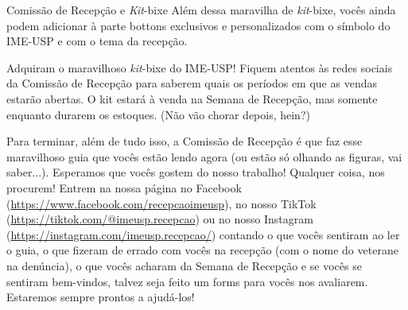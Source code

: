 \begin{secao}{Comissão de Recepção e \textit{Kit}-bixe}
Além dessa maravilha de \textit{kit}-bixe, vocês ainda podem adicionar à parte bottons
exclusivos e personalizados com o símbolo do IME-USP e com o tema da recepção.

Adquiram o maravilhoso \textit{kit}-bixe do IME-USP! Fiquem atentos às redes sociais da
Comissão de Recepção para saberem quais os períodos em que as vendas estarão abertas.
O kit estará à venda na Semana de Recepção, mas somente enquanto
durarem os estoques. (Não vão chorar depois, hein?)

Para terminar, além de tudo isso, a Comissão de Recepção é que faz esse maravilhoso 
guia que vocês estão lendo agora (ou estão só olhando as figuras, vai saber...). 
Esperamos que vocês gostem do nosso trabalho! Qualquer coisa, nos
procurem! Entrem na nossa página no Facebook (\url{https://www.facebook.com/recepcaoimeusp}),
no nosso TikTok (\url{https://tiktok.com/@imeusp.recepcao})
ou no nosso Instagram (\url{https://instagram.com/imeusp.recepcao/}) contando
o que vocês sentiram ao ler o guia, o que fizeram de errado com vocês na
recepção (com o nome do veterane na denúncia), o que vocês acharam da Semana
de Recepção e se vocês se sentiram bem-vindos, talvez seja feito um forms para 
vocês nos avaliarem. Estaremos sempre prontos a ajudá-los!
\end{secao}
